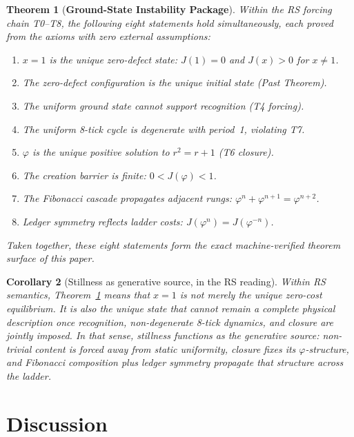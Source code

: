 \documentclass[11pt,a4paper]{article}
\newcommand{\Jcost}{J}
\newcommand{\phirs}{\varphi}
\newtheorem{theorem}{Theorem}[section]
\newtheorem{corollary}[theorem]{Corollary}
\begin{document}
\begin{theorem}[\textbf{Ground-State Instability Package}]
\label{thm:stillness}
Within the RS forcing chain T0--T8, the following eight statements hold simultaneously, each proved from the axioms with zero external assumptions:
\begin{enumerate}
\item $x=1$ is the unique zero-defect state: $\Jcost(1)=0$ and $\Jcost(x)>0$ for $x\neq 1$.
\item The zero-defect configuration is the unique initial state (Past Theorem).
\item The uniform ground state cannot support recognition (T4 forcing).
\item The uniform 8-tick cycle is degenerate with period~1, violating T7.
\item $\phirs$ is the unique positive solution to $r^2=r+1$ (T6 closure).
\item The creation barrier is finite: $0<\Jcost(\phirs)<1$.
\item The Fibonacci cascade propagates adjacent rungs: $\phirs^n+\phirs^{n+1}=\phirs^{n+2}$.
\item Ledger symmetry reflects ladder costs: $\Jcost(\phirs^n)=\Jcost(\phirs^{-n})$.
\end{enumerate}
Taken together, these eight statements form the exact machine-verified theorem surface of this paper.
\end{theorem}

\begin{corollary}[Stillness as generative source, in the RS reading]
Within RS semantics, Theorem~\ref{thm:stillness} means that $x=1$ is not merely the unique zero-cost equilibrium.  It is also the unique state that cannot remain a complete physical description once recognition, non-degenerate 8-tick dynamics, and closure are jointly imposed.  In that sense, stillness functions as the generative source: non-trivial content is forced away from static uniformity, closure fixes its $\phirs$-structure, and Fibonacci composition plus ledger symmetry propagate that structure across the ladder.
\end{corollary}

\section{Discussion}
\label{sec:discussion}
\end{document}
